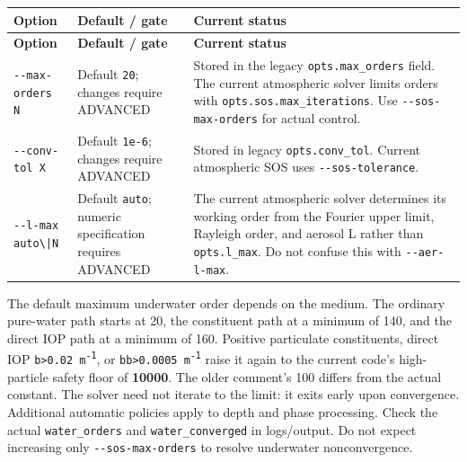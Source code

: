 {\TableFont
\begin{longtable}{@{}>{\raggedright\arraybackslash}p{}>{\raggedright\arraybackslash}p{}>{\raggedright\arraybackslash}p{}@{}}
\toprule
\textbf{Option} & \textbf{Default / gate} & \textbf{Current status} \\
\midrule
\endfirsthead
\toprule
\textbf{Option} & \textbf{Default / gate} & \textbf{Current status} \\
\midrule
\endhead
\bottomrule
\endfoot
\texttt{-\allowbreak{}-\allowbreak{}max-\allowbreak{}orders N} & Default \texttt{20}; changes require ADVANCED & Stored in the legacy \texttt{opts.\allowbreak{}max\_\allowbreak{}orders} field. The current atmospheric solver limits orders with \texttt{opts.\allowbreak{}sos.\allowbreak{}max\_\allowbreak{}iterations}. Use \texttt{-\allowbreak{}-\allowbreak{}sos-\allowbreak{}max-\allowbreak{}orders} for actual control. \\
\texttt{-\allowbreak{}-\allowbreak{}conv-\allowbreak{}tol X} & Default \texttt{1e-\allowbreak{}6}; changes require ADVANCED & Stored in legacy \texttt{opts.\allowbreak{}conv\_\allowbreak{}tol}. Current atmospheric SOS uses \texttt{-\allowbreak{}-\allowbreak{}sos-\allowbreak{}tolerance}. \\
\texttt{-\allowbreak{}-\allowbreak{}l-\allowbreak{}max auto\textbackslash{}|N} & Default \texttt{auto}; numeric specification requires ADVANCED & The current atmospheric solver determines its working order from the Fourier upper limit, Rayleigh order, and aerosol L rather than \texttt{opts.\allowbreak{}l\_\allowbreak{}max}. Do not confuse this with \texttt{-\allowbreak{}-\allowbreak{}aer-\allowbreak{}l-\allowbreak{}max}. \\
\end{longtable}
}

The default maximum underwater order depends on the medium. The ordinary pure-water path starts at 20, the constituent path at a minimum of 140, and the direct IOP path at a minimum of 160. Positive particulate constituents, direct IOP \texttt{b>0.\allowbreak{}02 m\textsuperscript{-}\textsuperscript{1}}, or \texttt{bb>0.\allowbreak{}0005 m\textsuperscript{-}\textsuperscript{1}} raise it again to the current code's high-particle safety floor of \textbf{10000}. The older comment's 100 differs from the actual constant. The solver need not iterate to the limit: it exits early upon convergence. Additional automatic policies apply to depth and phase processing. Check the actual \texttt{water\_\allowbreak{}orders} and \texttt{water\_\allowbreak{}converged} in logs/output. Do not expect increasing only \texttt{-\allowbreak{}-\allowbreak{}sos-\allowbreak{}max-\allowbreak{}orders} to resolve underwater nonconvergence.

